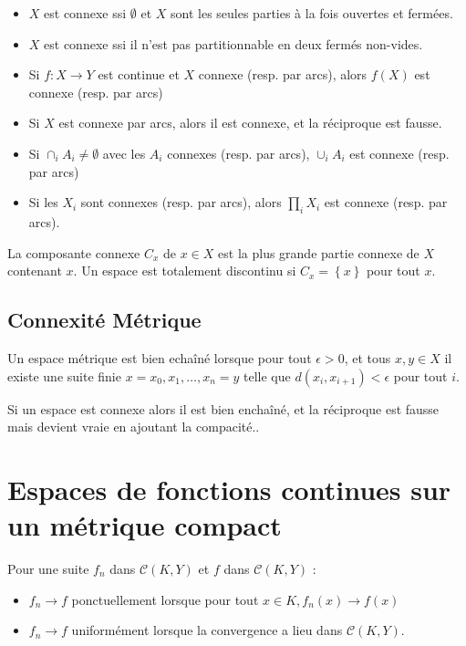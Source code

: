 \documentclass{cours}
\begin{document}
\begin{theorem}
    \begin{itemize}
        \item $X$ est connexe ssi $\emptyset$ et $X$ sont les seules parties à la fois ouvertes et fermées.
        \item $X$ est connexe ssi il n'est pas partitionnable en deux fermés non-vides.
        \item Si $f : X \to Y$ est continue et $X$ connexe (resp. par arcs), alors $f(X)$ est connexe (resp. par arcs)
        \item Si $X$ est connexe par arcs, alors il est connexe, et la réciproque est fausse.
        \item Si $\cap_{i} A_{i} \neq \emptyset$ avec les $A_{i}$ connexes (resp. par arcs), $\cup_{i} A_{i}$ est connexe (resp. par arcs)
        \item Si les $X_{i}$ sont connexes (resp. par arcs), alors $\prod_{i} X_{i}$ est connexe (resp. par arcs).
    \end{itemize}
\end{theorem}

\begin{definition}
    La composante connexe $C_{x}$ de $x \in X$ est la plus grande partie connexe de $X$ contenant $x$. Un espace est totalement discontinu si $C_{x} = \left\{x\right\}$ pour tout $x$.
\end{definition}

\subsection{Connexité Métrique}
\begin{definition}
    Un espace métrique est bien echaîné lorsque pour tout $\epsilon >0$, et tous $x, y \in X$ il existe une suite finie $x = x_{0}, x_{1}, \ldots, x_{n} = y$ telle que $d(x_{i}, x_{i+1}) < \epsilon$ pour tout $i$.
\end{definition}

\begin{theorem}
    Si un espace est connexe alors il est bien enchaîné, et la réciproque est fausse mais devient vraie en ajoutant la compacité..
\end{theorem}

\section{Espaces de fonctions continues sur un métrique compact}
\begin{definition}
    Pour une suite $f_{n}$ dans $\mathcal{C}(K, Y)$ et $f$ dans $\mathcal{C}(K, Y)$ : \begin{itemize}
        \item $f_{n} \to f$ ponctuellement lorsque pour tout $x\in K, f_{n}(x) \to f(x)$
        \item $f_{n} \to f$ uniformément lorsque la convergence a lieu dans $\mathcal{C}(K, Y)$.
    \end{itemize}
\end{definition}
\end{document}
